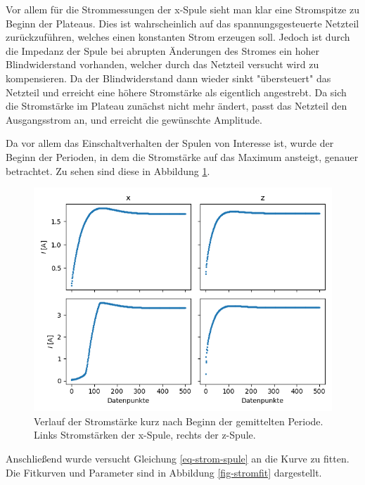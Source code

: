 \documentclass[page,pdftex,12pt,a4paper,twoside,openright]{scrbook}
\begin{document}
Vor allem für die Strommessungen der x-Spule sieht man klar eine Stromspitze zu Beginn der Plateaus. Dies ist wahrscheinlich auf das spannungsgesteuerte Netzteil zurückzuführen, welches einen konstanten Strom erzeugen soll. Jedoch ist durch die Impedanz der Spule bei abrupten Änderungen des Stromes ein hoher Blindwiderstand vorhanden, welcher durch das Netzteil versucht wird zu kompensieren. Da der Blindwiderstand dann wieder sinkt "übersteuert" das Netzteil und erreicht eine höhere Stromstärke als eigentlich angestrebt. Da sich die Stromstärke im Plateau zunächst nicht mehr ändert, passt das Netzteil den Ausgangsstrom an, und erreicht die gewünschte Amplitude.

Da vor allem das Einschaltverhalten der Spulen von Interesse ist, wurde der Beginn der Perioden, in dem die Stromstärke auf das Maximum ansteigt, genauer betrachtet. Zu sehen sind diese in Abbildung \ref{fig-strom_anfang}.
\begin{figure}[H]
\centering
\includegraphics[width=\textwidth]{img/strom_anfang.png}
\caption{\label{fig-strom_anfang}
Verlauf der Stromstärke kurz nach Beginn der gemittelten Periode. Links Stromstärken der x-Spule, rechts der z-Spule.}
\end{figure}

Anschließend wurde versucht Gleichung \ref{eq-strom-spule} an die Kurve zu fitten. Die Fitkurven und Parameter sind in Abbildung \ref{fig-stromfit} dargestellt.
\end{document}
